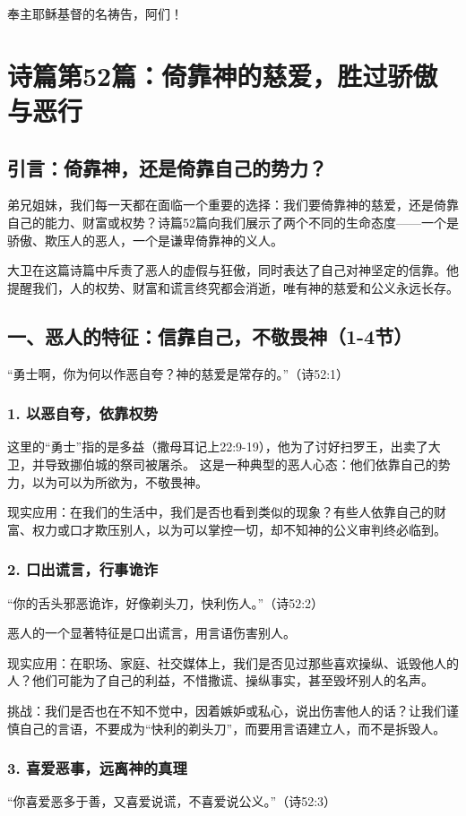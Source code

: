 \documentclass[a4paper, 12pt]{article}
\begin{document}
奉主耶稣基督的名祷告，阿们！
\newpage
\section{诗篇第52篇：倚靠神的慈爱，胜过骄傲与恶行}
\subsection*{引言：倚靠神，还是倚靠自己的势力？}
\hspace{0.6cm}弟兄姐妹，我们每一天都在面临一个重要的选择：我们要倚靠神的慈爱，还是倚靠自己的能力、财富或权势？诗篇52篇向我们展示了两个不同的生命态度——一个是骄傲、欺压人的恶人，一个是谦卑倚靠神的义人。

大卫在这篇诗篇中斥责了恶人的虚假与狂傲，同时表达了自己对神坚定的信靠。他提醒我们，人的权势、财富和谎言终究都会消逝，唯有神的慈爱和公义永远长存。
\subsection*{一、恶人的特征：信靠自己，不敬畏神（1-4节）}
“勇士啊，你为何以作恶自夸？神的慈爱是常存的。”（诗52:1）

\subsubsection*{1. 以恶自夸，依靠权势}
\hspace{0.6cm}这里的“勇士”指的是多益（撒母耳记上22:9-19），他为了讨好扫罗王，出卖了大卫，并导致挪伯城的祭司被屠杀。
这是一种典型的恶人心态：他们依靠自己的势力，以为可以为所欲为，不敬畏神。

现实应用：在我们的生活中，我们是否也看到类似的现象？有些人依靠自己的财富、权力或口才欺压别人，以为可以掌控一切，却不知神的公义审判终必临到。
\subsubsection*{2. 口出谎言，行事诡诈}
“你的舌头邪恶诡诈，好像剃头刀，快利伤人。”（诗52:2）

恶人的一个显著特征是口出谎言，用言语伤害别人。

现实应用：在职场、家庭、社交媒体上，我们是否见过那些喜欢操纵、诋毁他人的人？他们可能为了自己的利益，不惜撒谎、操纵事实，甚至毁坏别人的名声。

挑战：我们是否也在不知不觉中，因着嫉妒或私心，说出伤害他人的话？让我们谨慎自己的言语，不要成为“快利的剃头刀”，而要用言语建立人，而不是拆毁人。
\subsubsection*{3. 喜爱恶事，远离神的真理}
“你喜爱恶多于善，又喜爱说谎，不喜爱说公义。”（诗52:3）
\end{document}
